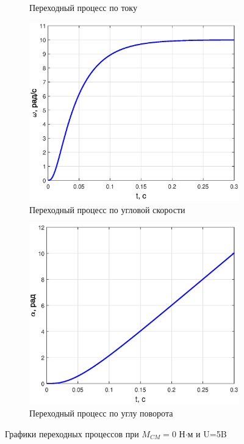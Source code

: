 \documentclass[12pt,a4paper]{article}
\begin{document}
\begin{figure}[H]
\begin{subfigure}[b]{0.48\textwidth}
		\caption{Переходный процесс по току}
	\end{subfigure}
	\begin{subfigure}[b]{0.48\textwidth}
		\includegraphics[width = \textwidth]{w0}
		\caption{Переходный процесс по угловой скорости}
	\end{subfigure}
	\hfill
	\begin{subfigure}[b]{0.48\textwidth}
		\includegraphics[width = \textwidth]{a0}
		\caption{Переходный процесс по углу поворота}
	\end{subfigure}
	\caption{Графики переходных процессов при $M_{CM}=0$ Н$\cdot$м и U=5B}
	\label{UIwa0}
\end{figure}
\end{document}
